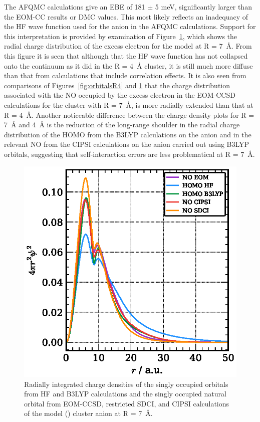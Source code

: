 The AFQMC calculations give an EBE of 181 $\pm$ 5 meV, significantly larger than the EOM-CC results or DMC values.
This most likely reflects an inadequacy of the HF wave function used for the anion in the AFQMC calculations.
Support for this interpretation is provided by examination of Figure~\ref{fig:orbitalsR7}, which shows the radial charge distribution of the excess electron for the  model at R = \SI{7}{\angstrom}.
From this figure it is seen that although that the HF wave function has not collapsed onto the continuum as it did in the R = \SI{4}{\angstrom} cluster, it is still much more diffuse than that from calculations that include correlation effects. It is also seen from comparisons of Figures~\ref{fig:orbitalsR4} and \ref{fig:orbitalsR7} that the charge distribution associated with the NO occupied by the excess electron in the EOM-CCSD calculations for the cluster with R = \SI{7}{\angstrom}, is more radially extended than that at R = \SI{4}{\angstrom}.
Another noticeable difference between the charge density plots for R = \SI{7}{\angstrom} and \SI{4}{\angstrom} is the reduction of the long-range shoulder in the radial charge distribution of the HOMO from the B3LYP calculations on the anion and in the relevant NO from the CIPSI calculations on the anion carried out using B3LYP orbitals, suggesting that self-interaction errors are less problematical at R = \SI{7}{\angstrom}.

 
\begin{figure}
    \caption{\label{fig:orbitalsR7} Radially integrated charge densities of the singly occupied orbitals from HF and B3LYP calculations and the singly occupied natural orbital from EOM-CCSD, restricted SDCI, and CIPSI calculations  of the model () cluster anion at R = \SI{7}{\angstrom}.}
    \includegraphics[width=\columnwidth,keepaspectratio]{Images/chapter3/r7_orbitalr2.eps}
\end{figure}

